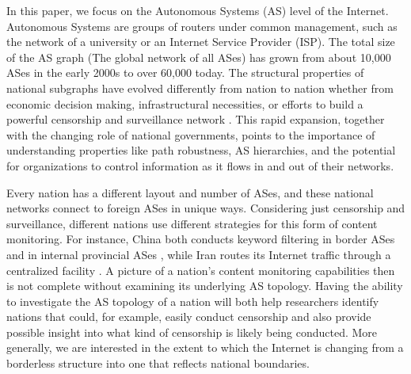 \par
In this paper, we focus on the Autonomous Systems (AS) level of the Internet.
Autonomous Systems are groups of routers under common management, such as the network of
a university or an Internet Service Provider (ISP).
The total size of the AS graph (The global network 
of all ASes) has grown from about 10,000 ASes in the early 2000s to over 60,000 today. 
The structural properties of national subgraphs have evolved differently
from nation to nation whether from economic decision making, infrastructural necessities, 
or efforts to build a powerful censorship and surveillance network \cite{economicPeering, irancensor}.
This rapid expansion, together with the changing role of national
governments, points to the importance of understanding properties like
path robustness, AS hierarchies, and the potential for organizations to
control information as it flows in and out of their networks.

\par Every nation has a different layout and number of ASes, and these
national networks connect to foreign ASes in unique ways. Considering
just censorship and surveillance, different nations use different
strategies for this form of content monitoring. For instance, China
both conducts keyword filtering in border ASes and in internal
provincial ASes \cite{chinafiltering}, while Iran routes its Internet
traffic through a centralized facility \cite{irancensor}.  A picture
of a nation's content monitoring capabilities then is not complete
without examining its underlying AS topology.  Having the ability to
investigate the AS topology of a nation will both help researchers
identify nations that could, for example, easily conduct censorship
and also provide possible insight into what kind of censorship is
likely being conducted.  More generally, we are interested in the extent to which the Internet is changing from a borderless structure into one that reflects national boundaries. 

